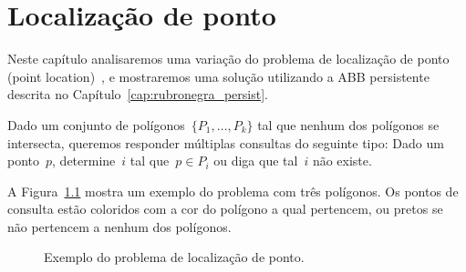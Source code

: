 \documentclass[main.tex]{subfiles}
\begin{document}
\chapter{Localização de ponto}

Neste capítulo analisaremos uma variação do problema de localização de ponto (point location)~\cite{SarnakT1986}, e mostraremos uma solução utilizando a ABB persistente descrita no Capítulo~\ref{cap:rubronegra_persist}.

Dado um conjunto de polígonos~${\{P_1, \ldots, P_k\}}$ tal que nenhum dos polígonos se intersecta, queremos responder múltiplas consultas do seguinte tipo: Dado um ponto~$p$, determine~$i$ tal que~${p \in P_i}$ ou diga que tal~$i$ não existe.

A Figura~\ref{fig:exemplo_pl} mostra um exemplo do problema com três polígonos. Os pontos de consulta estão coloridos com a cor do polígono a qual pertencem, ou pretos se não pertencem a nenhum dos polígonos.


\begin{figure}
\centering
{}
\caption{Exemplo do problema de localização de ponto.} \label{fig:exemplo_pl}
\end{figure}
\end{document}

